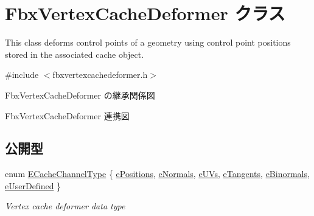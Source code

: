 \hypertarget{class_fbx_vertex_cache_deformer}{}\section{Fbx\+Vertex\+Cache\+Deformer クラス}
\label{class_fbx_vertex_cache_deformer}


This class deforms control points of a geometry using control point positions stored in the associated cache object.  




{\ttfamily \#include $<$fbxvertexcachedeformer.\+h$>$}



Fbx\+Vertex\+Cache\+Deformer の継承関係図


Fbx\+Vertex\+Cache\+Deformer 連携図
\subsection*{公開型}
\begin{DoxyCompactItemize}
\item 
enum \hyperlink{class_fbx_vertex_cache_deformer_a24f0c46d4f47717615852a8e7346efed}{E\+Cache\+Channel\+Type} \{ \newline
\hyperlink{class_fbx_vertex_cache_deformer_a24f0c46d4f47717615852a8e7346efedac49b3b06ec07fe6742bd8ff98e7d0fff}{e\+Positions}, 
\hyperlink{class_fbx_vertex_cache_deformer_a24f0c46d4f47717615852a8e7346efeda738fd8550a4585af86b9dde23838f019}{e\+Normals}, 
\hyperlink{class_fbx_vertex_cache_deformer_a24f0c46d4f47717615852a8e7346efedaac37961370b1bb10824e64a01adf1c21}{e\+U\+Vs}, 
\hyperlink{class_fbx_vertex_cache_deformer_a24f0c46d4f47717615852a8e7346efedafdee2e48b083adbf565b3bf511cbcce5}{e\+Tangents}, 
\newline
\hyperlink{class_fbx_vertex_cache_deformer_a24f0c46d4f47717615852a8e7346efeda9bbd6f088e2be8754e3b8c4a5b5943be}{e\+Binormals}, 
\hyperlink{class_fbx_vertex_cache_deformer_a24f0c46d4f47717615852a8e7346efedafdf33d4ddb69c7cc595986665c3eab27}{e\+User\+Defined}
 \}\begin{DoxyCompactList}\small\item\em Vertex cache deformer data type \end{DoxyCompactList}
\end{DoxyCompactItemize}
